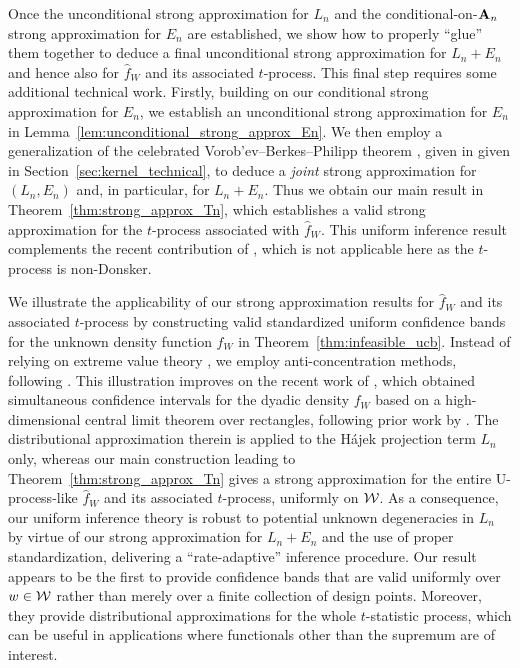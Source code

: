 Once the unconditional strong approximation for $L_n$ and the
conditional-on-$\mathbf{A}_n$ strong approximation for $E_n$ are established, we show
how to properly ``glue'' them together to deduce a final unconditional strong
approximation for $L_n+E_n$ and hence also for $\hat{f}_W$ and its associated
$t$-process. This final step requires some additional technical work. Firstly,
building on our conditional strong approximation for $E_n$, we establish an
unconditional strong approximation for $E_n$ in
Lemma~\ref{lem:unconditional_strong_approx_En}. We then employ a generalization
of the celebrated Vorob'ev--Berkes--Philipp theorem \citep{dudley1999uniform},
given in given in Section~\ref{sec:kernel_technical}, to deduce a \emph{joint}
strong approximation for $(L_n,E_n)$ and, in particular, for $L_n+E_n$. Thus we
obtain our main result in Theorem~\ref{thm:strong_approx_Tn}, which establishes
a valid strong approximation for the $t$-process associated with $\hat{f}_W$.
This uniform inference result complements the recent contribution of
\citet{davezies2021exchangeable}, which is not applicable here as
the $t$-process is non-Donsker.

We illustrate the applicability of our strong approximation results for
$\hat{f}_W$ and its associated $t$-process by constructing valid standardized
uniform confidence bands for the unknown density function $f_W$
in Theorem~\ref{thm:infeasible_ucb}. Instead of
relying on extreme value theory \citep*[as in][]{gine2004kernel}, we employ
anti-concentration methods, following \citet{chernozhukov2014anti}. This
illustration improves on the recent work of \citet{chiang2022inference}, which
obtained simultaneous confidence intervals for the dyadic density $f_W$ based
on a high-dimensional central limit theorem over rectangles, following prior
work by \citet{chernozhukov2017central}. The distributional
approximation therein is applied to the H\'{a}jek projection term $L_n$ only,
whereas our main construction leading to Theorem~\ref{thm:strong_approx_Tn}
gives a strong approximation for the entire U-process-like $\hat{f}_W$ and its
associated $t$-process, uniformly on $\mathcal{W}$. As a consequence, our uniform
inference theory is robust to potential unknown degeneracies in $L_n$ by virtue
of our strong approximation for $L_n+E_n$ and the use of proper standardization,
delivering a ``rate-adaptive'' inference procedure. Our result appears to be
the first to provide confidence bands that are valid uniformly over $w \in \mathcal{W}$
rather than merely over a finite collection of design points. Moreover, they
provide distributional approximations for the whole $t$-statistic process,
which can be useful in applications where functionals other than the supremum
are of interest.

